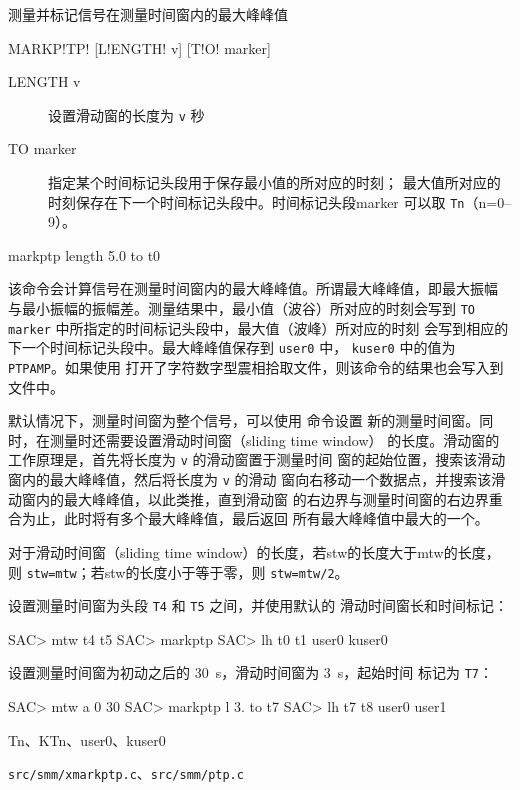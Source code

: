 \label{cmd:markptp}

测量并标记信号在测量时间窗内的最大峰峰值

\begin{SACSTX}
MARKP!TP! [L!ENGTH! v] [T!O! marker]
\end{SACSTX}

\begin{description}
\item [LENGTH v] 设置滑动窗的长度为 \texttt{v} 秒
\item [TO marker] 指定某个时间标记头段用于保存最小值的所对应的时刻；
    最大值所对应的时刻保存在下一个时间标记头段中。时间标记头段marker
    可以取 \texttt{Tn}（n=0--9）。
\end{description}

\begin{SACDFT}
markptp length 5.0 to t0
\end{SACDFT}

该命令会计算信号在测量时间窗内的最大峰峰值。所谓最大峰峰值，即最大振幅
与最小振幅的振幅差。测量结果中，最小值（波谷）所对应的时刻会写到
\texttt{TO marker} 中所指定的时间标记头段中，最大值（波峰）所对应的时刻
会写到相应的下一个时间标记头段中。最大峰峰值保存到 \texttt{user0} 中，
\texttt{kuser0} 中的值为 \texttt{PTPAMP}。如果使用 
打开了字符数字型震相拾取文件，则该命令的结果也会写入到文件中。

默认情况下，测量时间窗为整个信号，可以使用  命令设置
新的测量时间窗。同时，在测量时还需要设置滑动时间窗（sliding time window）
的长度。滑动窗的工作原理是，首先将长度为 \texttt{v} 的滑动窗置于测量时间
窗的起始位置，搜索该滑动窗内的最大峰峰值，然后将长度为 \texttt{v} 的滑动
窗向右移动一个数据点，并搜索该滑动窗内的最大峰峰值，以此类推，直到滑动窗
的右边界与测量时间窗的右边界重合为止，此时将有多个最大峰峰值，最后返回
所有最大峰峰值中最大的一个。

对于滑动时间窗（sliding time window）的长度，若stw的长度大于mtw的长度，
则 \texttt{stw=mtw}；若stw的长度小于等于零，则 \texttt{stw=mtw/2}。

设置测量时间窗为头段 \texttt{T4} 和 \texttt{T5} 之间，并使用默认的
滑动时间窗长和时间标记：
\begin{SACCode}
SAC> mtw t4 t5
SAC> markptp
SAC> lh t0 t1 user0 kuser0
\end{SACCode}

设置测量时间窗为初动之后的 \SI{30}{s}，滑动时间窗为 \SI{3}{s}，起始时间
标记为 \texttt{T7}：
\begin{SACCode}
SAC> mtw a 0 30
SAC> markptp l 3. to t7
SAC> lh t7 t8 user0 user1
\end{SACCode}

Tn、KTn、user0、kuser0

\texttt{src/smm/xmarkptp.c}、\texttt{src/smm/ptp.c}
